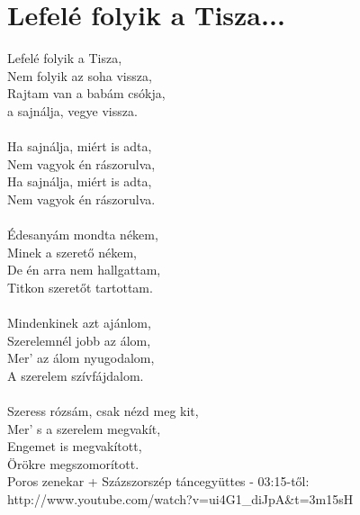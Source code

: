 \section{Lefelé folyik a Tisza...}
Lefelé folyik a Tisza,\\
Nem folyik az soha vissza,\\
Rajtam van a babám csókja,\\
a sajnálja, vegye vissza.\\\\
Ha sajnálja, miért is adta,\\
Nem vagyok én rászorulva,\\
Ha sajnálja, miért is adta,\\
Nem vagyok én rászorulva.\\\\
Édesanyám mondta nékem,\\
Minek a szerető nékem,\\
De én arra nem hallgattam,\\
Titkon szeretőt tartottam.\\\\
Mindenkinek azt ajánlom,\\
Szerelemnél jobb az álom,\\
Mer' az álom nyugodalom,\\
A szerelem szívfájdalom.\\\\
Szeress rózsám, csak nézd meg kit,\\
Mer' s a szerelem megvakít,\\
Engemet is megvakított,\\
Örökre megszomorított.\\

Poros zenekar + Százszorszép táncegyüttes - 03:15-től:
http://www.youtube.com/watch?v=ui4G1\_diJpA\&t=3m15sH



